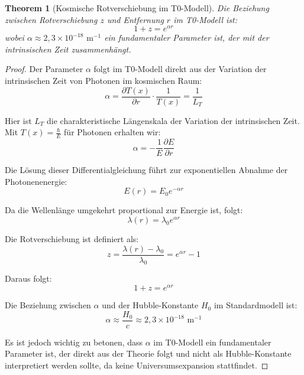 \documentclass{article}
\newtheorem{theorem}{Theorem}[section]
\theoremstyle{definition}
\theoremstyle{remark}
\newcommand{\Tfield}{T(x)} %
\begin{document}
		\begin{theorem}[Kosmische Rotverschiebung im T0-Modell]
			Die Beziehung zwischen Rotverschiebung $z$ und Entfernung $r$ im T0-Modell ist:
			\begin{equation}
				1 + z = e^{\alpha r}
			\end{equation}
			wobei $\alpha \approx 2,3 \times 10^{-18} \text{ m}^{-1}$ ein fundamentaler Parameter ist, der mit der intrinsischen Zeit zusammenhängt.
		\end{theorem}
		
		\begin{proof}
			Der Parameter $\alpha$ folgt im T0-Modell direkt aus der Variation der intrinsischen Zeit von Photonen im kosmischen Raum:
			\begin{equation}
				\alpha = \frac{\partial \Tfield}{\partial r} \cdot \frac{1}{\Tfield} = \frac{1}{L_T}
			\end{equation}
			
			Hier ist $L_T$ die charakteristische Längenskala der Variation der intrinsischen Zeit. Mit $\Tfield = \frac{\hbar}{E}$ für Photonen erhalten wir:
			\begin{equation}
				\alpha = -\frac{1}{E}\frac{\partial E}{\partial r}
			\end{equation}
			
			Die Lösung dieser Differentialgleichung führt zur exponentiellen Abnahme der Photonenenergie:
			\begin{equation}
				E(r) = E_0 e^{-\alpha r}
			\end{equation}
			
			Da die Wellenlänge umgekehrt proportional zur Energie ist, folgt:
			\begin{equation}
				\lambda(r) = \lambda_0 e^{\alpha r}
			\end{equation}
			
			Die Rotverschiebung ist definiert als:
			\begin{equation}
				z = \frac{\lambda(r) - \lambda_0}{\lambda_0} = e^{\alpha r} - 1
			\end{equation}
			
			Daraus folgt:
			\begin{equation}
				1 + z = e^{\alpha r}
			\end{equation}
			
			Die Beziehung zwischen $\alpha$ und der Hubble-Konstante $H_0$ im Standardmodell ist:
			\begin{equation}
				\alpha \approx \frac{H_0}{c} \approx 2,3 \times 10^{-18} \text{ m}^{-1}
			\end{equation}
			
			Es ist jedoch wichtig zu betonen, dass $\alpha$ im T0-Modell ein fundamentaler Parameter ist, der direkt aus der Theorie folgt und nicht als Hubble-Konstante interpretiert werden sollte, da keine Universumsexpansion stattfindet.
		\end{proof}
		
\end{document}
